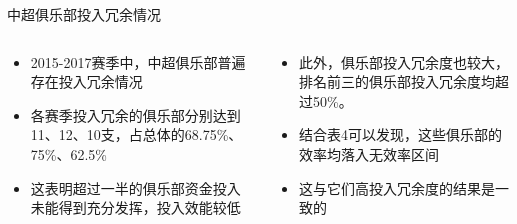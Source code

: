 \documentclass[]{beamer}
\begin{document}
\begin{frame}{中超俱乐部投入冗余情况}
\begin{columns}
    \begin{column}{0.5\textwidth}
    \begin{itemize}
        \item 2015-2017赛季中，中超俱乐部普遍存在投入冗余情况
        \item 各赛季投入冗余的俱乐部分别达到11、12、10支，占总体的68.75\%、75\%、62.5\%
        \item 这表明超过一半的俱乐部资金投入未能得到充分发挥，投入效能较低
    \end{itemize}
    \end{column}
    \begin{column}{0.5\textwidth}
    \begin{itemize}
        \item 此外，俱乐部投入冗余度也较大，排名前三的俱乐部投入冗余度均超过50\%。
        \item 结合表4可以发现，这些俱乐部的效率均落入无效率区间
        \item 这与它们高投入冗余度的结果是一致的
    \end{itemize}
    \end{column}
\end{columns}
\end{frame}




\end{document}

